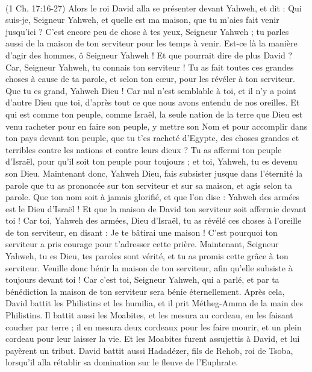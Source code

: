 \begin{multicols}{2}
{\\(1 Ch. 17:16-27)}
Alors le roi David alla se présenter devant Yahweh, et dit : Qui suis-je, Seigneur Yahweh, et quelle est ma maison, que tu m'aies fait venir jusqu’ici ?
C’est encore peu de chose à tes yeux, Seigneur Yahweh ; tu parles aussi de la maison de ton serviteur pour les temps à venir. Est-ce là la manière d'agir des hommes, ô Seigneur Yahweh !
Et que pourrait dire de plus David ? Car, Seigneur Yahweh, tu connais ton serviteur !
Tu as fait toutes ces grandes choses à cause de ta parole, et selon ton cœur, pour les révéler à ton serviteur.
Que tu es grand, Yahweh Dieu ! Car nul n'est semblable à toi, et il n'y a point d'autre Dieu que toi, d’après tout ce que nous avons entendu de nos oreilles.
Et qui est comme ton peuple, comme Israël, la seule nation de la terre que Dieu est venu racheter pour en faire son peuple, y mettre son Nom et pour accomplir dans ton pays devant ton peuple, que tu t'es racheté d'Egypte, des choses grandes et terribles contre les nations et contre leurs dieux ?
Tu as affermi ton peuple d'Israël, pour qu’il soit ton peuple pour toujours ; et toi, Yahweh, tu es devenu son Dieu.
Maintenant donc, Yahweh Dieu, fais subsister jusque dans l'éternité la parole que tu as prononcée sur ton serviteur et sur sa maison, et agis selon ta parole.
Que ton nom soit à jamais glorifié, et que l'on dise : Yahweh des armées est le Dieu d'Israël ! Et que la maison de David ton serviteur soit affermie devant toi !
Car toi, Yahweh des armées, Dieu d'Israël, tu as révélé ces choses à l’oreille de ton serviteur, en disant : Je te bâtirai une maison ! C'est pourquoi ton serviteur a pris courage pour t'adresser cette prière.
Maintenant, Seigneur Yahweh, tu es Dieu, tes paroles sont vérité, et tu as promis cette grâce à ton serviteur.
Veuille donc bénir la maison de ton serviteur, afin qu'elle subsiste à toujours devant toi ! Car c'est toi, Seigneur Yahweh, qui a parlé, et par ta bénédiction la maison de ton serviteur sera bénie éternellement.
\VerseOne{}Après cela, David battit les Philistins et les humilia, et il prit Métheg-Amma de la main des Philistins.
Il battit aussi les Moabites, et les mesura au cordeau, en les faisant coucher par terre ; il en mesura deux cordeaux pour les faire mourir, et un plein cordeau pour leur laisser la vie. Et les Moabites furent assujettis à David, et lui payèrent un tribut.
David battit aussi Hadadézer, fils de Rehob, roi de Tsoba, lorsqu’il alla rétablir sa domination sur le fleuve de l’Euphrate.

\end{multicols}
